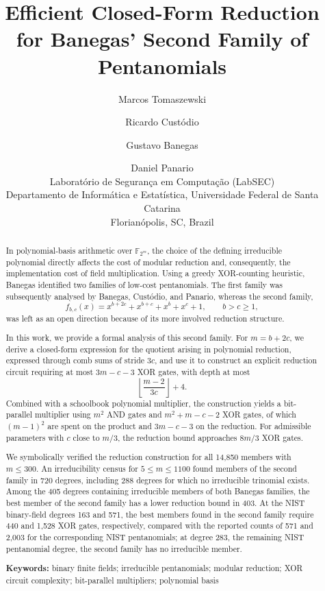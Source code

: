 \documentclass[11pt,a4paper]{article}
\title{\textbf{Efficient Closed-Form Reduction for Banegas’ Second Family of Pentanomials}}
\author{Marcos Tomaszewski \and Ricardo Custódio \and Gustavo Banegas \and Daniel Panario \\[4pt]
\small Laboratório de Segurança em Computação (LabSEC)\\
\small Departamento de Informática e Estatística, Universidade Federal de Santa Catarina\\
\small Florianópolis, SC, Brazil}
\date{}
\theoremstyle{plain}
\theoremstyle{definition}
\begin{document}
\maketitle

\begin{abstract}

In polynomial-basis arithmetic over \(\mathbb{F}_{2^m}\), the choice of the defining irreducible polynomial directly affects the cost of modular reduction and, consequently, the implementation cost of field multiplication. Using a greedy XOR-counting heuristic, Banegas identified two families of low-cost pentanomials. The first family was subsequently analysed by Banegas, Custódio, and Panario, whereas the second family,
\[
f_{b,c}(x)=x^{b+2c}+x^{b+c}+x^b+x^c+1,
\qquad b>c\ge1,
\]
was left as an open direction because of its more involved reduction structure.

In this work, we provide a formal analysis of this second family. For \(m=b+2c\), we derive a closed-form expression for the quotient arising in polynomial reduction, expressed through comb sums of stride \(3c\), and use it to construct an explicit reduction circuit requiring at most \(3m-c-3\) XOR gates, with depth at most
\[
\left\lfloor\frac{m-2}{3c}\right\rfloor+4.
\]
Combined with a schoolbook polynomial multiplier, the construction yields a bit-parallel multiplier using \(m^2\) AND gates and \(m^2+m-c-2\) XOR gates, of which \((m-1)^2\) are spent on the product and \(3m-c-3\) on the reduction. For admissible parameters with \(c\) close to \(m/3\), the reduction bound approaches \(8m/3\) XOR gates.

We symbolically verified the reduction construction for all 14,850 members with \(m\le300\). An irreducibility census for \(5\le m\le1100\) found members of the second family in 720 degrees, including 288 degrees for which no irreducible trinomial exists. Among the 405 degrees containing irreducible members of both Banegas families, the best member of the second family has a lower reduction bound in 403. At the NIST binary-field degrees 163 and 571, the best members found in the second family require 440 and 1,528 XOR gates, respectively, compared with the reported counts of 571 and 2,003 for the corresponding NIST pentanomials; at
degree 283, the remaining NIST pentanomial degree, the second family has no irreducible member.

\medskip\noindent\textbf{Keywords:} binary finite fields; irreducible pentanomials; modular reduction; XOR circuit complexity; bit-parallel multipliers; polynomial basis
\end{abstract}
\end{document}
